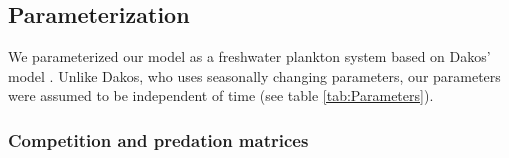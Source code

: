 \subsection{Parameterization}
\label{subsec:Parameterization}
We parameterized our model as a freshwater plankton system based on Dakos' model \citep{Dakos2009b}. Unlike Dakos, who uses seasonally changing parameters, our parameters were assumed to be independent of time (see table \ref{tab:Parameters}).

\begin{table}[H]
	\begin{center}
	\end{center}
	\caption{Values and meanings of the parameters used in our numerical experiment. The elements of the predation ($S$) and competition ($A$) matrices are drawn from probability distributions described in subsection \ref{subsubsec:CompetitionParameter}.}
	\label{tab:Parameters}
\end{table}

\subsubsection{Competition and predation matrices}
\label{subsubsec:CompetitionParameter}

